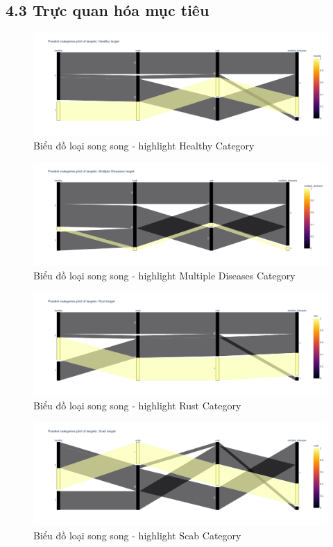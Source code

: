 \documentclass{article}
\begin{document}
	\subsection{4.3 Trực quan hóa mục tiêu}
	\begin{figure}[H]
		\centering
		\includegraphics[width=1\linewidth]{images/parallel_categories_healthy_target.png}
		\caption{Biểu đồ loại song song - highlight Healthy Category}
		\label{fig:writing-thesis}
	\end{figure}
	\begin{figure}[H]
		\centering
		\includegraphics[width=1\linewidth]{images/parallel_categories_multiple_deseases.png}
		\caption{Biểu đồ loại song song - highlight Multiple Diseases Category}
		\label{fig:writing-thesis}
	\end{figure}
	\begin{figure}[H]
		\centering
		\includegraphics[width=1\linewidth]{images/parallel_categories_rust_target.png}
		\caption{Biểu đồ loại song song - highlight Rust Category}
		\label{fig:writing-thesis}
	\end{figure}
	\begin{figure}[H]
		\centering
		\includegraphics[width=1\linewidth]{images/parallel_categories_scab_target.png}
		\caption{Biểu đồ loại song song - highlight Scab Category}
		\label{fig:writing-thesis}
	\end{figure}
\end{document}
